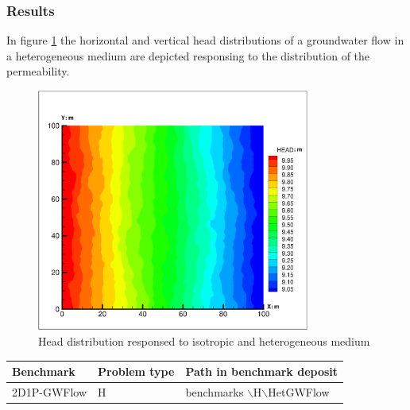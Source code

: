 \subsubsection*{Results}

In figure \ref{HeadDis} the horizontal and vertical head distributions of a groundwater flow in a heterogeneous medium are depicted responsing to the distribution of the permeability. 

\begin{figure}[htbp]
\centering
\includegraphics[width=0.8\textwidth]{H_GW/figures/HeadDis.eps}
\caption{Head distribution responsed to isotropic and heterogeneous medium}
\label{HeadDis}
\end{figure}

\begin{tabular}{|l|l|l|}
\hline
Benchmark & Problem type	& Path in benchmark deposit \\
\hline	
2D1P-GWFlow	& H	& benchmarks $\backslash$H$\backslash$HetGWFlow \\
\hline	
\end{tabular}